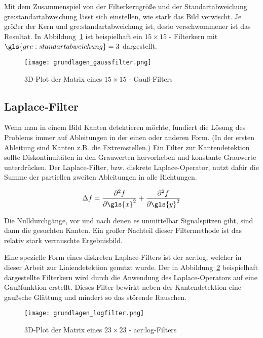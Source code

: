 Mit dem Zusammenspiel von der Filterkerngröße und der Standartabweichung \gls{gre:standartabweichung} lässt sich einstellen, wie stark das Bild verwischt. Je größer der Kern und \gls{gre:standartabweichung} ist, desto verschwommener ist das Resultat. In Abbildung~\ref{fig:grundlagen_gaussfilter} ist beispielhaft ein \( 15\times15\) - Filterkern mit \( \gls{gre:standartabweichung} = 3\) dargestellt.

\begin{figure}[H] %
  \centering
  \texttt{[image: grundlagen\_gaussfilter.png]}
  \caption{3D-Plot der Matrix eines \( 15\times15\) - Gauß-Filters}
  \label{fig:grundlagen_gaussfilter}
\end{figure}  

\subsection{Laplace-Filter}

Wenn man in einem Bild Kanten detektieren möchte, fundiert die Lösung des Problems immer auf Ableitungen in der einen oder anderen Form. (In der ersten Ableitung sind Kanten z.B. die Extremstellen.) Ein Filter zur Kantendetektion sollte Diskontinuitäten in den Grauwerten hervorheben und konstante Grauwerte unterdrücken. Der Laplace-Filter, bzw. diskrete Laplace-Operator, nutzt dafür die Summe der partiellen zweiten Ableitungen in alle Richtungen. \autocite{jaehneDigitaleBildverarbeitungMit2005}

\begin{equation}
\Delta f = \frac{\partial^2 f}{\partial {\gls{x}}^2} + \frac{\partial^2 f}{\partial {\gls{y}}^2}
\end{equation}

Die Nulldurchgänge, vor und nach denen es unmittelbar Signalspitzen gibt, sind dann die gesuchten Kanten. Ein großer Nachteil dieser Filtermethode ist das relativ stark verrauschte Ergebnisbild.

Eine spezielle Form eines diskreten Laplace-Filters ist der \gls{acr:log}, welcher in dieser Arbeit zur Liniendetektion genutzt wurde. Der in Abbildung~\ref{fig:grundlagen_logfilter} beispielhaft dargestellte Filterkern wird durch die Anwendung des Laplace-Operators auf eine Gaußfunktion erstellt. Dieses Filter bewirkt neben der Kantendetektion eine gaußsche Glättung und mindert so das störende Rauschen.

\begin{figure}[H] %
  \centering
  \texttt{[image: grundlagen\_logfilter.png]}
  \caption{3D-Plot der Matrix eines \( 23\times23\) - \gls{acr:log}-Filters}
  \label{fig:grundlagen_logfilter}
\end{figure}  

